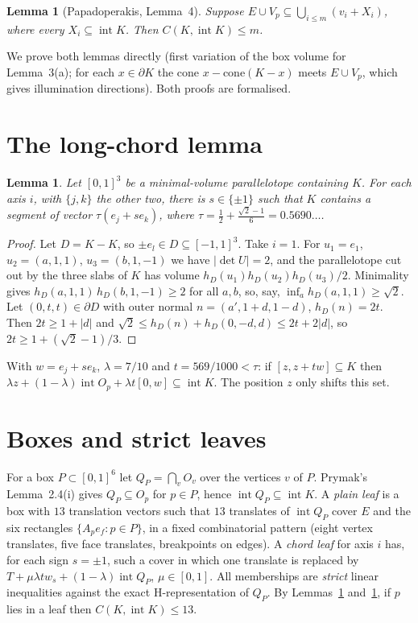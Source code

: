 \documentclass[11pt]{article}
\newtheorem{lemma}[theorem]{Lemma}
\newcommand{\inter}{\operatorname{int}}
\begin{document}
\begin{lemma}[Papadoperakis, Lemma~4]\label{lem:red}
Suppose $E\cup V_p\subseteq\bigcup_{i\le m}(v_i+X_i)$, where every $X_i\subseteq\inter K$. Then
$C(K,\inter K)\le m$.
\end{lemma}

We prove both lemmas directly (first variation of the box volume for Lemma~3(a); for each $x\in\partial K$ the
cone $x-\mathrm{cone}(K-x)$ meets $E\cup V_p$, which gives illumination directions). Both proofs are formalised.

\section{The long-chord lemma}
\begin{lemma}\label{lem:M}
Let $[0,1]^3$ be a minimal-volume parallelotope containing $K$. For each axis $i$, with $\{j,k\}$ the other two,
there is $s\in\{\pm1\}$ such that $K$ contains a segment of vector $\tau(e_j+se_k)$, where
$\tau=\tfrac12+\tfrac{\sqrt2-1}{6}=0.5690\ldots$.
\end{lemma}
\begin{proof}
Let $D=K-K$, so $\pm e_l\in D\subseteq[-1,1]^3$. Take $i=1$. For $u_1=e_1$, $u_2=(a,1,1)$, $u_3=(b,1,-1)$ we have
$|\det U|=2$, and the parallelotope cut out by the three slabs of $K$ has volume
$h_D(u_1)h_D(u_2)h_D(u_3)/2$. Minimality gives $h_D(a,1,1)\,h_D(b,1,-1)\ge2$ for all $a,b$, so, say,
$\inf_a h_D(a,1,1)\ge\sqrt2$. Let $(0,t,t)\in\partial D$ with outer normal $n=(a',1+d,1-d)$, $h_D(n)=2t$. Then
$2t\ge1+|d|$ and $\sqrt2\le h_D(n)+h_D(0,-d,d)\le 2t+2|d|$, so $2t\ge1+(\sqrt2-1)/3$.
\end{proof}

With $w=e_j+se_k$, $\lambda=7/10$ and $t=569/1000<\tau$: if $[z,z+tw]\subseteq K$ then
$\lambda z+(1-\lambda)\inter O_p+\lambda t[0,w]\subseteq\inter K$. The position $z$ only shifts this set.

\section{Boxes and strict leaves}
For a box $P\subset[0,1]^6$ let $Q_P=\bigcap_{v}O_v$ over the vertices $v$ of $P$. Prymak's Lemma~2.4(i) gives
$Q_P\subseteq O_p$ for $p\in P$, hence $\inter Q_P\subseteq\inter K$. A \emph{plain leaf} is a box with $13$
translation vectors such that $13$ translates of $\inter Q_P$ cover $E$ and the six rectangles
$\{A_pe_f:p\in P\}$, in a fixed combinatorial pattern (eight vertex translates, five face translates, breakpoints
on edges). A \emph{chord leaf} for axis $i$ has, for each sign $s=\pm1$, such a cover in which one translate is
replaced by $T+\mu\lambda t w_s+(1-\lambda)\inter Q_P$, $\mu\in[0,1]$. All memberships are \emph{strict} linear
inequalities against the exact H-representation of $Q_P$. By Lemmas~\ref{lem:red} and~\ref{lem:M}, if $p$ lies in a
leaf then $C(K,\inter K)\le 13$.
\end{document}

